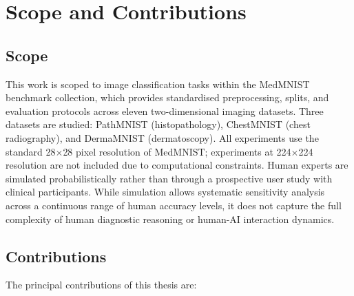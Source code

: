 \section{Scope and Contributions}

\subsection{Scope}

This work is scoped to image classification tasks within the MedMNIST~\cite{yang2021medmnist} benchmark collection, which provides standardised preprocessing, splits, and evaluation protocols across eleven two-dimensional imaging datasets. Three datasets are studied: PathMNIST (histopathology), ChestMNIST (chest radiography), and DermaMNIST (dermatoscopy). All experiments use the standard 28$\times$28 pixel resolution of MedMNIST; experiments at 224$\times$224 resolution are not included due to computational constraints. Human experts are simulated probabilistically rather than through a prospective user study with clinical participants. While simulation allows systematic sensitivity analysis across a continuous range of human accuracy levels, it does not capture the full complexity of human diagnostic reasoning or human-AI interaction dynamics.

\subsection{Contributions}

The principal contributions of this thesis are:


